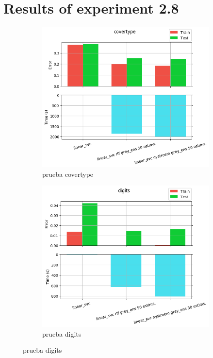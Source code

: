 
\chapter{Results of experiment 2.8} %

\label{Appendix2-8} %

\begin{figure}[ht]
  \centering
  \begin{subfigure}[b]{0.5\linewidth}
    \centering\includegraphics[width=\imgscale\linewidth]{Figures/2_8/covertype}
    \caption{prueba covertype}
    \label{fig:2_8_covertype}
  \end{subfigure}%
  \begin{subfigure}[b]{0.5\linewidth}
    \centering\includegraphics[width=\imgscale\linewidth]{Figures/2_8/digits}
    \caption{prueba digits}
    \label{fig:2_8_digits}
  \end{subfigure}
\end{figure}


